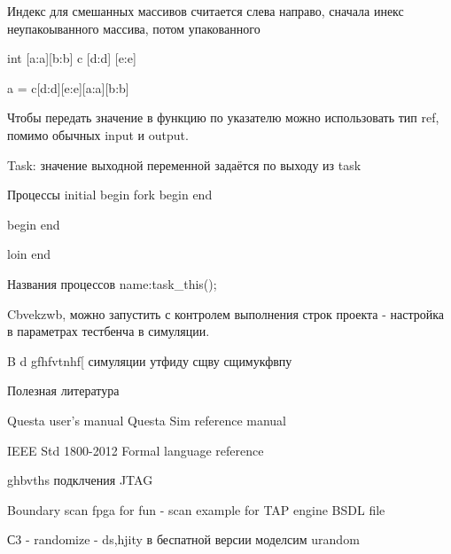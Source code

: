 \documentclass[a4paper, 12pt]{extarticle}
\begin{document}
Индекс для смешанных массивов  считается слева направо, сначала инекс неупакоыванного массива, потом упакованного

int [a:a][b:b] c [d:d] [e:e]

a = c[d:d][e:e][a:a][b:b]

Чтобы передать значение в функцию по указателю можно использовать тип ref, помимо обычных input и output.

Task: значение выходной переменной задаётся по выходу из task


Процессы
initial
	begin
		fork
			begin
			end

			begin
			end

		loin
	end



Названия процессов name:task_this();


Cbvekzwb, можно запустить с контролем выполнения строк проекта - настройка в параметрах тестбенча в симуляции.

B d gfhfvtnhf[ симуляции утфиду сщву сщимукфвпу


Полезная литература

Questa user's manual
Questa Sim reference manual

IEEE Std 1800-2012
Formal language reference


ghbvths подклчения JTAG

Boundary scan
fpga for fun - scan example for TAP engine
BSDL file

С3 - randomize - ds,hjity в беспатной версии моделсим
urandom
\end{document}
